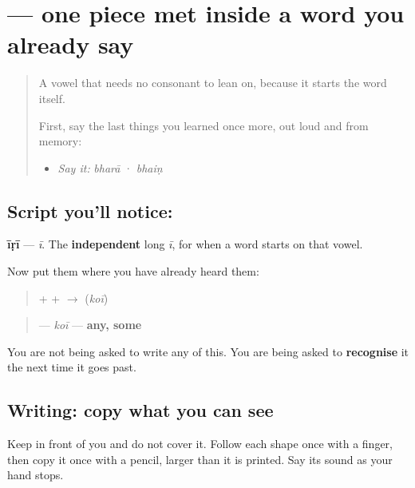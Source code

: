 \section[\texorpdfstring{\pa{ਈ} (ī)}{ਈ (ī)}]{ — one piece met inside a word you already say}

\label{lesson:PA-S12-eeri}



\begin{quote}
A vowel that needs no consonant to lean on, because it starts the word itself.

First, say the last things you learned once more, out loud and from memory:

\begin{itemize}
\raggedright
  \item \emph{Say it:} \emph{bharā} · \emph{bhaiṇ}
\end{itemize}
\end{quote}

\subsection*{Script you'll notice: }
\begin{quote}
\end{quote}

\textbf{īṛī} — \emph{ī}. The \textbf{independent} long \emph{ī}, for when a word starts on that vowel.

Now put them where you have already heard them:

\begin{quote}
\textbf{} + \textbf{} + \textbf{} $\to$ \textbf{} (\emph{koī})
\end{quote}

\begin{quote}
\textbf{} — \emph{koī} — \textbf{any, some}
\end{quote}

You are not being asked to write any of this. You are being asked to \textbf{recognise} it the next time it goes past.

\subsection*{Writing: copy what you can see}
Keep  in front of you and do not cover it. Follow each shape once with a finger, then copy it once with a pencil, larger than it is printed. Say its sound as your hand stops.


